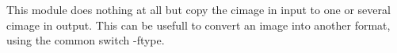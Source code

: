 This module does nothing at all but copy the cimage in input
to one or several cimage in output.
This can be usefull to convert an image into another format,
using the common switch -ftype.

